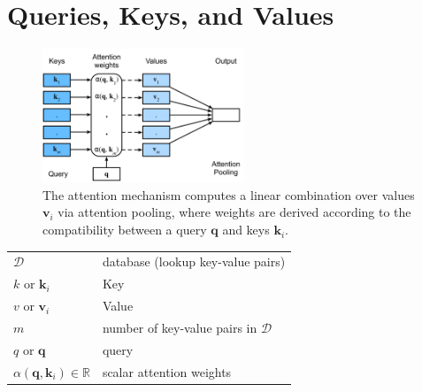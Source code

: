 \section{Queries, Keys, and Values \cite{dnn-1}}

\begin{figure}[H]
    \centering
    \includegraphics[width=\linewidth, height=4cm, keepaspectratio]{Pictures/deep_neural_networks/attention-qkv.jpg}
    \caption*{The attention mechanism computes a linear combination over values $\mathbf{v}_\mathit{i}$ via attention pooling, where weights are derived according to the compatibility between a query $\mathbf{q}$ and keys $\mathbf{k}_\mathit{i}$.}
\end{figure}

\begin{customTableWrapper}{1.5}
\begin{longtable}{l p{8cm}}
    $\mathcal{D}$ & database (lookup key-value pairs) \\

    $k$ or $\mathbf{k}_i$ & Key \\

    $v$ or $\mathbf{v}_i$ & Value \\

    $m$ & number of key-value pairs in $\mathcal{D}$ \\

    $q$ or $\mathbf{q}$ & query \\

    $\alpha(\mathbf{q}, \mathbf{k}_i) \in \mathbb{R}$ & scalar attention weights \\

\end{longtable}
\end{customTableWrapper}

